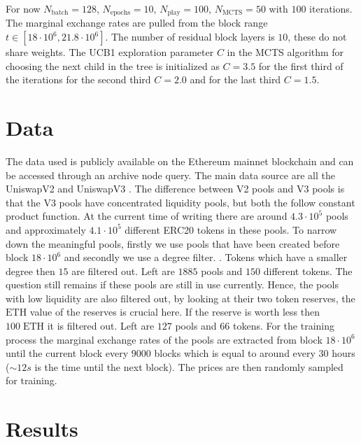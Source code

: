 For now $N_{\text{batch} }=128$, $N_{\text{epochs}} = 10$, $N_{\text{play}} =
100$, $N_{\text{MCTS}} = 50$ with $100$ iterations. The marginal exchange
rates are pulled from the block range $t \in [18\cdot10^{6}, 21.8\cdot10^6]$.
The number of residual block layers is $10$, these do not share weights. The
UCB1 exploration parameter $C$ in the MCTS algorithm for choosing the next
child in the tree is initialized as $C=3.5$ for the first third of the
iterations for the second third $C=2.0$ and for the last third $C=1.5$.
\section{Data}
The data used is publicly available on the Ethereum mainnet blockchain and
can be accessed through an archive node query. The main data source are all
the UniswapV2 and UniswapV3 \cite{uniswap}. The difference between V2 pools
and V3 pools is that the V3 pools have concentrated liquidity pools, but both
the follow constant product function. At the current time of writing there
are around $4.3\cdot10^{5}$ pools and approximately $4.1\cdot10^{5}$
different ERC20 \cite{erc20} tokens in these pools. To narrow down the
meaningful pools, firstly we use pools that have been created before block
$18\cdot10^{6}$ and secondly we use a degree filter. . Tokens which have a
smaller degree then $15$ are filtered out. Left are $1885$ pools and $150$
different tokens. The question still remains if these pools are still in use
currently. Hence, the pools with low liquidity are also filtered out, by
looking at their two token reserves, the $\text{ETH}$ value of the
reserves is crucial here. If the reserve is worth less then $100\; \text{ETH} $
it is filtered out. Left are $127$ pools and $66$ tokens. For the training
process the marginal exchange rates of the pools are extracted from block
$18\cdot10^{6}$ until the current block every $9000$ blocks which is equal
to around every $30$ hours ($\sim12s$ is the time until the next block). The
prices are then randomly sampled for training.
\section{Results}

